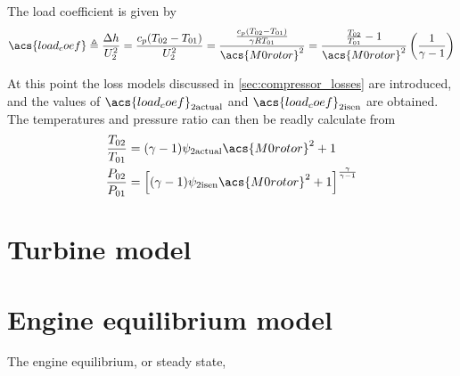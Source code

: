 \documentclass[tcc]{subfiles}
\begin{document}
The load coefficient is given by
\begin{equation}
    \acs{load_coef}\triangleq \frac{\Delta h}{U_2^2}
                      = \frac{c_p(T_{02}-T_{01})}{U_2^2}
                      = \frac{\frac{c_p(T_{02}-T_{01})}{\gamma R T_{01}}}
                                    {\acs{M0rotor}^2}
                      = \frac{\frac{T_{02}}{T_{01}}-1}
                                  {\acs{M0rotor}^2}
                        \left(\frac{1}{\gamma-1}\right)
\end{equation}

At this point the loss models discussed in \cref{sec:compressor_losses} are introduced, 
and the values of $\acs{load_coef}_{2\text{actual}}$ and $\acs{load_coef}_{2\text{isen}}$ are obtained.
The temperatures and pressure ratio can then be readly calculate from
\begin{align}
    \label{eqn:psi2Tratio}
    \frac{T_{02}}{T_{01}} &= (\gamma - 1)\psi_{2\text{actual}} \acs{M0rotor}^2 + 1 \\
    \label{eqn:psi2Pratio}
    \frac{P_{02}}{P_{01}} &= \left[(\gamma - 1)\psi_{2\text{isen}} \acs{M0rotor}^2 + 1\right]^\frac{\gamma}{\gamma-1}
\end{align}


\section{Turbine model}




\section{Engine equilibrium model}


The engine equilibrium, or steady state, 
\end{document}
